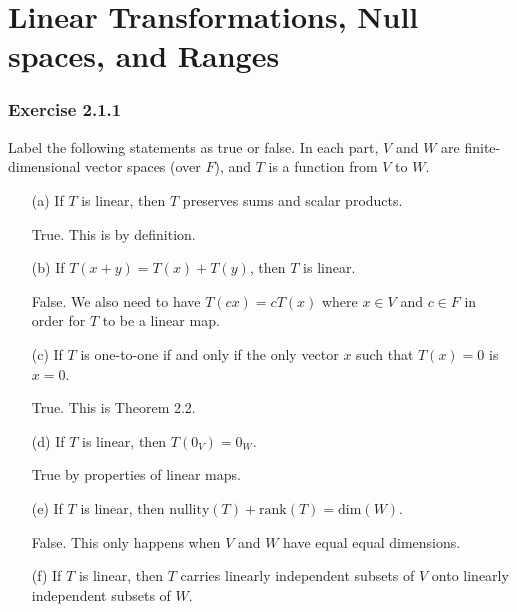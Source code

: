 \section{Linear Transformations, Null spaces, and Ranges}

\subsubsection{Exercise 2.1.1} Label the following statements as true or false. In each part, \( V  \) and \( W  \) are finite-dimensional vector spaces (over \( F \)), and \( T  \) is a function from \( V  \) to \( W  \).
\begin{enumerate}
    \item[(a)] If \( T  \) is linear, then \( T  \) preserves sums and scalar products.
        \begin{solution}
           True. This is by definition.
        \end{solution}
    \item[(b)] If \( T(x+y) = T(x) + T(y)   \), then \( T  \) is linear.
        \begin{solution}
            False. We also need to have \( T(cx) = cT(x)  \) where \( x \in V  \) and \( c \in F  \) in order for \( T  \) to be a linear map.
        \end{solution}
    \item[(c)] If \( T  \) is one-to-one if and only if the only vector \( x  \) such that \( T(x) = 0  \) is \( x = 0  \).
        \begin{solution}
            True. This is Theorem 2.2.
        \end{solution}
    \item[(d)] If \( T  \) is linear, then \( T(0_{V}) = 0_{W} \).
       \begin{solution}
            True by properties of linear maps.
        \end{solution}
    \item[(e)] If \( T  \) is linear, then \( \text{nullity}(T) + \text{rank}(T) = \text{dim}(W) \).
        \begin{solution}
         False. This only happens when \( V  \) and \( W  \) have equal equal dimensions.   
        \end{solution}
    \item[(f)] If \( T  \) is linear, then \( T  \) carries linearly independent subsets of \( V  \) onto linearly independent subsets of \( W  \).
        \begin{solution}

\end{solution}
\end{enumerate}
